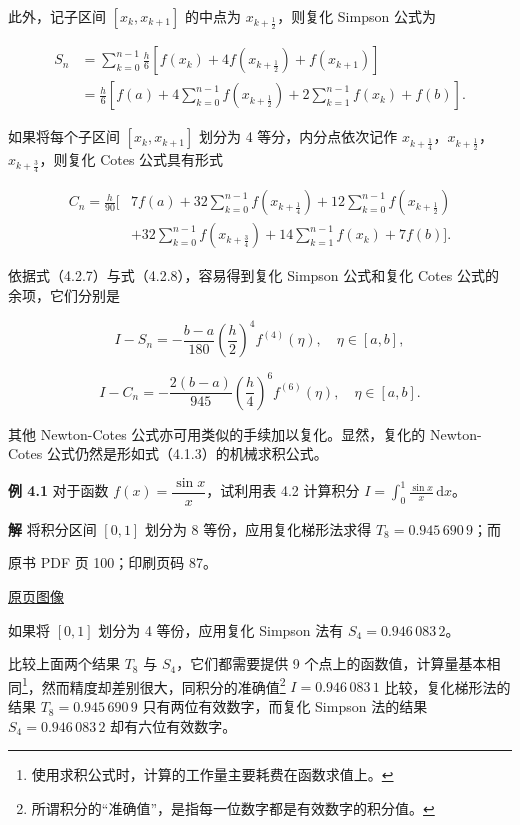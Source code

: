 此外，记子区间 \([x_k,x_{k+1}]\) 的中点为 \(x_{k+\frac12}\)，则复化 Simpson 公式为

\[
\begin{aligned}
S_n&=\sum_{k=0}^{n-1}\frac h6[f(x_k)+4f(x_{k+\frac12})+f(x_{k+1})]\\
&=\frac h6\left[f(a)+4\sum_{k=0}^{n-1}f(x_{k+\frac12})+2\sum_{k=1}^{n-1}f(x_k)+f(b)\right].
\end{aligned}
\tag{4.2.11}
\]

如果将每个子区间 \([x_k,x_{k+1}]\) 划分为 4 等分，内分点依次记作 \(x_{k+\frac14}\)，\(x_{k+\frac12}\)，\(x_{k+\frac34}\)，则复化 Cotes 公式具有形式

\[
\begin{aligned}
C_n=\frac h{90}\biggl[&7f(a)+32\sum_{k=0}^{n-1}f(x_{k+\frac14})+12\sum_{k=0}^{n-1}f(x_{k+\frac12})\\
&+32\sum_{k=0}^{n-1}f(x_{k+\frac34})+14\sum_{k=1}^{n-1}f(x_k)+7f(b)\biggr].
\end{aligned}
\tag{4.2.12}
\]

依据式（4.2.7）与式（4.2.8），容易得到复化 Simpson 公式和复化 Cotes 公式的余项，它们分别是

\[
I-S_n=-\frac{b-a}{180}\left(\frac h2\right)^4f^{(4)}(\eta),\quad\eta\in[a,b],
\tag{4.2.13}
\]

\[
I-C_n=-\frac{2(b-a)}{945}\left(\frac h4\right)^6f^{(6)}(\eta),\quad\eta\in[a,b].
\tag{4.2.14}
\]

其他 Newton-Cotes 公式亦可用类似的手续加以复化。显然，复化的 Newton-Cotes 公式仍然是形如式（4.1.3）的机械求积公式。

\textbf{例 4.1} 对于函数 \(f(x)=\dfrac{\sin x}{x}\)，试利用表 4.2 计算积分 \(I=\displaystyle\int_0^1\frac{\sin x}{x}\,\mathrm{d}x\)。

\textbf{解} 将积分区间 \([0,1]\) 划分为 8 等份，应用复化梯形法求得 \(T_8=0.945\,690\,9\)；而

\clearpage

原书 PDF 页 100；印刷页码 87。

\href{source-images/pdf-100.jpeg}{原页图像}

如果将 \([0,1]\) 划分为 4 等份，应用复化 Simpson 法有 \(S_4=0.946\,083\,2\)。

比较上面两个结果 \(T_8\) 与 \(S_4\)，它们都需要提供 9 个点上的函数值，计算量基本相同\footnote{使用求积公式时，计算的工作量主要耗费在函数求值上。}，然而精度却差别很大，同积分的准确值\footnote{所谓积分的``准确值''，是指每一位数字都是有效数字的积分值。} \(I=0.946\,083\,1\) 比较，复化梯形法的结果 \(T_8=0.945\,690\,9\) 只有两位有效数字，而复化 Simpson 法的结果 \(S_4=0.946\,083\,2\) 却有六位有效数字。

